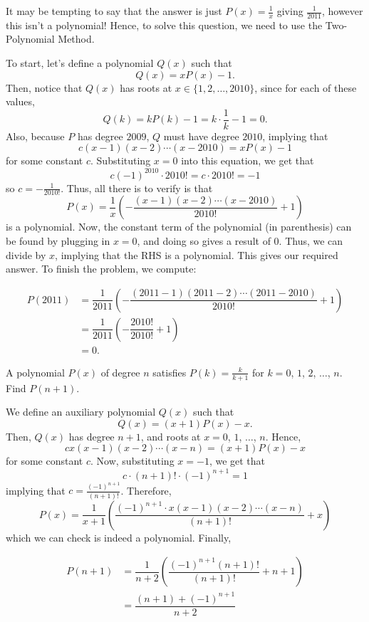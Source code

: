 \documentclass[11pt]{scrartcl}
\begin{document}
It may be tempting to say that the answer is just $P(x) = \tfrac{1}{x}$ giving $\tfrac{1}{2011}$, however this isn't a polynomial! Hence, to solve this question, we need to use the Two-Polynomial Method.

To start, let's define a polynomial $Q(x)$ such that \[Q(x) = xP(x)-1.\] Then, notice that $Q(x)$ has roots at $x \in \{1, 2, \dots, 2010\}$, since for each of these values, \[Q(k) = kP(k)-1 = k\cdot \dfrac{1}{k}-1 = 0.\] Also, because $P$ has degree $2009$, $Q$ must have degree $2010$, implying that \[c(x-1)(x-2)\cdots(x-2010) = xP(x)-1\] for some constant $c$. Substituting $x = 0$ into this equation, we get that \[c(-1)^{2010}\cdot 2010! =c\cdot 2010! = -1\] so $c = -\tfrac{1}{2010!}$. Thus, all there is to verify is that \[P(x) = \dfrac{1}{x}\left(-\dfrac{(x-1)(x-2)\cdots(x-2010)}{2010!}+1\right)\] is a polynomial. Now, the constant term of the polynomial (in parenthesis) can be found by plugging in $x = 0$, and doing so gives a result of $0$. Thus, we can divide by $x$, implying that the RHS is a polynomial. This gives our required answer. To finish the problem, we compute:

\begin{align*}
P(2011) &= \dfrac{1}{2011}\left(-\dfrac{(2011-1)(2011-2)\cdots(2011-2010)}{2010!}+1\right) \\
&= \dfrac{1}{2011}\left(-\dfrac{2010!}{2010!}+1\right) \\
&= \boxed{0}.
\end{align*}

\begin{example*}[USAMO 1975/3]
A polynomial $P(x)$ of degree $n$ satisfies $P(k) = \tfrac{k}{k+1}$ for $k = 0$, $1$, $2$, $\dots$, $n$. Find $P(n + 1)$.
\end{example*}

We define an auxiliary polynomial $Q(x)$ such that \[Q(x) = (x+1)P(x)-x.\] Then, $Q(x)$ has degree $n+1$, and roots at $x = 0$, $1$, $\dots$, $n$. Hence, \[cx(x-1)(x-2)\cdots(x-n) = (x+1)P(x)-x\] for some constant $c$. Now, substituting $x = -1$, we get that \[c\cdot (n+1)!\cdot (-1)^{n+1} = 1\] implying that $c = \tfrac{(-1)^{n+1}}{(n+1)!}$. Therefore, \[P(x) = \dfrac{1}{x+1}\left(\dfrac{(-1)^{n+1}\cdot x(x-1)(x-2)\cdots(x-n)}{(n+1)!}+x\right)\] which we can check is indeed a polynomial. Finally,

\begin{align*}
P(n+1) &= \dfrac{1}{n+2}\left(\dfrac{(-1)^{n+1}(n+1)!}{(n+1)!}+n+1\right) \\
&= \boxed{\dfrac{(n+1)+(-1)^{n+1}}{n+2}}
\end{align*}
\end{document}
